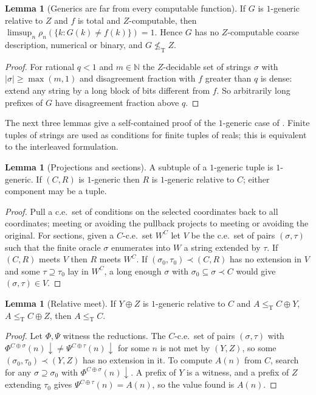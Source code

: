 \documentclass[11pt,letterpaper]{article}
\theoremstyle{definition}
\newtheorem{lemma}[definition]{Lemma}
\numberwithin{equation}{section}
\newcommand{\N}{\mathbb N}
\newcommand{\leT}{\le_{\mathrm T}}
\newcommand{\nleT}{\nleq_{\mathrm T}}
\newcommand{\dn}{{\downarrow}}
\newcommand{\src}[1]{\leavevmode{\sffamily\footnotesize\color{Steel}[#1]}}
\begin{document}
\begin{lemma}[Generics are far from every computable function]\label{lem:genericfar}\src{R2, R6, R7; with bound $1/2$ R1}
If $G$ is $1$-generic relative to $Z$ and $f$ is total and $Z$-computable, then $\limsup_n\rho_n(\{k:G(k)\ne f(k)\})=1$. Hence $G$ has no $Z$-computable coarse description, numerical or binary, and $G\nleT Z$.
\end{lemma}
\begin{proof}
For rational $q<1$ and $m\in\N$ the $Z$-decidable set of strings $\sigma$ with $|\sigma|\ge\max(m,1)$ and disagreement fraction with $f$ greater than $q$ is dense: extend any string by a long block of bits different from $f$. So arbitrarily long prefixes of $G$ have disagreement fraction above $q$.
\end{proof}

The next three lemmas give a self-contained proof of the $1$-generic case of \cite[Theorem~4.2]{HJKS}. Finite tuples of strings are used as conditions for finite tuples of reals; this is equivalent to the interleaved formulation.

\begin{lemma}[Projections and sections]\label{lem:sections}\src{R1}
A subtuple of a $1$-generic tuple is $1$-generic. If $(C,R)$ is $1$-generic then $R$ is $1$-generic relative to $C$; either component may be a tuple.
\end{lemma}
\begin{proof}
Pull a c.e.\ set of conditions on the selected coordinates back to all coordinates; meeting or avoiding the pullback projects to meeting or avoiding the original. For sections, given a $C$-c.e.\ set $W^C$ let $V$ be the c.e.\ set of pairs $(\sigma,\tau)$ such that the finite oracle $\sigma$ enumerates into $W$ a string extended by $\tau$. If $(C,R)$ meets $V$ then $R$ meets $W^C$. If $(\sigma_0,\tau_0)\prec(C,R)$ has no extension in $V$ and some $\tau\supseteq\tau_0$ lay in $W^C$, a long enough $\sigma$ with $\sigma_0\subseteq\sigma\prec C$ would give $(\sigma,\tau)\in V$.
\end{proof}

\begin{lemma}[Relative meet]\label{lem:relmeet}\src{R1}
If $Y\oplus Z$ is $1$-generic relative to $C$ and $A\leT C\oplus Y$, $A\leT C\oplus Z$, then $A\leT C$.
\end{lemma}
\begin{proof}
Let $\Phi,\Psi$ witness the reductions. The $C$-c.e.\ set of pairs $(\sigma,\tau)$ with $\Phi^{C\oplus\sigma}(n)\dn\ne\Psi^{C\oplus\tau}(n)\dn$ for some $n$ is not met by $(Y,Z)$, so some $(\sigma_0,\tau_0)\prec(Y,Z)$ has no extension in it. To compute $A(n)$ from $C$, search for any $\sigma\supseteq\sigma_0$ with $\Phi^{C\oplus\sigma}(n)\dn$. A prefix of $Y$ is a witness, and a prefix of $Z$ extending $\tau_0$ gives $\Psi^{C\oplus\tau}(n)=A(n)$, so the value found is $A(n)$.
\end{proof}
\end{document}
